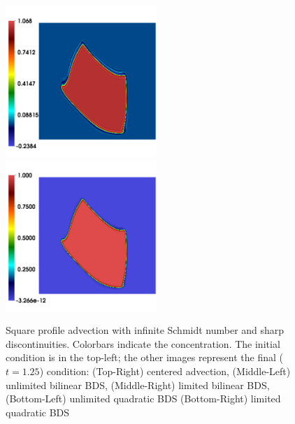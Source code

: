 \documentclass[final]{siamltex}
\begin{document}
\begin{figure}
\begin{center}
\includegraphics[width=2.25in]{square_unl_q_bds}
\includegraphics[width=2.25in]{square_lim_q_bds}
\caption{Square profile advection with infinite Schmidt number and sharp discontinuities.
Colorbars indicate the concentration.  The initial condition is in the top-left; the
other images represent the final ($t=1.25$) condition:
(Top-Right) centered advection,
(Middle-Left) unlimited bilinear BDS,
(Middle-Right) limited bilinear BDS,
(Bottom-Left) unlimited quadratic BDS
(Bottom-Right) limited quadratic BDS}
\label{fig:square}
\end{center}
\end{figure}
\end{document}
